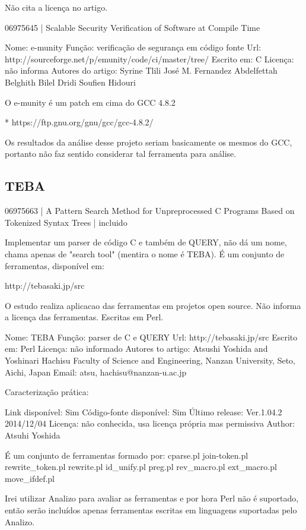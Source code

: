 Não cita a licença no artigo.

06975645 | Scalable Security Verification of Software at Compile Time

Nome: e-munity
Função: verificação de segurança em código fonte
Url: http://sourceforge.net/p/emunity/code/ci/master/tree/
Escrito em: C
Licença: não informa
Autores do artigo: Syrine Tlili
                   José M. Fernandez
                   Abdelfettah Belghith
                   Bilel Dridi
                   Soufien Hidouri

O e-munity é um patch em cima do GCC 4.8.2

* https://ftp.gnu.org/gnu/gcc/gcc-4.8.2/

Os resultados da análise desse projeto seriam basicamente os mesmos do GCC, portanto não
faz sentido considerar tal ferramenta para análise.


\subsection{TEBA}

06975663 | A Pattern Search Method for Unpreprocessed C Programs Based on Tokenized Syntax Trees | incluido

Implementar um parser de código C e também de QUERY, não dá um nome, chama
apenas de "search tool" (mentira o nome é TEBA). É um conjunto de ferramentas, disponível em:

http://tebasaki.jp/src

O estudo realiza aplicacao das ferramentas em projetos open source. Não
informa a licença das ferramentas. Escritas em Perl.

Nome: TEBA
Função: parser de C e QUERY
Url: http://tebasaki.jp/src
Escrito em: Perl
Licença: não informado
Autores to artigo: Atsushi Yoshida and Yoshinari Hachisu
                   Faculty of Science and Engineering, Nanzan University, Seto, Aichi, Japan
                   Email: {atsu, hachisu}@nanzan-u.ac.jp

Caracterização prática:

Link disponível: Sim
Código-fonte disponível: Sim
Último release:  Ver.1.04.2 2014/12/04
Licença: não conhecida, usa licença própria mas permissiva
Author: Atsuhi Yoshida

É um conjunto de ferramentas formado por: cparse.pl join-token.pl
rewrite\_token.pl rewrite.pl id\_unify.pl preg.pl rev\_macro.pl ext\_macro.pl
move\_ifdef.pl

Irei utilizar Analizo para avaliar as ferramentas e por hora Perl não é suportado, então
serão incluídos apenas ferramentas escritas em linguagens suportadas pelo Analizo.

